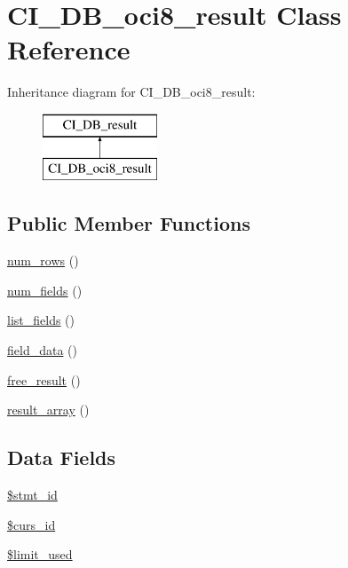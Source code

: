 \hypertarget{class_c_i___d_b__oci8__result}{\section{C\-I\-\_\-\-D\-B\-\_\-oci8\-\_\-result Class Reference}
\label{class_c_i___d_b__oci8__result}
}
Inheritance diagram for C\-I\-\_\-\-D\-B\-\_\-oci8\-\_\-result\-:\begin{figure}[H]
\begin{center}
\leavevmode
\includegraphics[height=2.000000cm]{class_c_i___d_b__oci8__result}
\end{center}
\end{figure}
\subsection*{Public Member Functions}
\begin{DoxyCompactItemize}
\item 
\hyperlink{class_c_i___d_b__oci8__result_a218657c303ee499b97710ab0cd2f5d6e}{num\-\_\-rows} ()
\item 
\hyperlink{class_c_i___d_b__oci8__result_af831bf363e4d7d661a717a4932af449d}{num\-\_\-fields} ()
\item 
\hyperlink{class_c_i___d_b__oci8__result_a50b54eb4ea7cfd039740f532988ea776}{list\-\_\-fields} ()
\item 
\hyperlink{class_c_i___d_b__oci8__result_a84bffd65e53902ade1591716749a33e3}{field\-\_\-data} ()
\item 
\hyperlink{class_c_i___d_b__oci8__result_aad2d98d6beb3d6095405356c6107b473}{free\-\_\-result} ()
\item 
\hyperlink{class_c_i___d_b__oci8__result_a444f7dd61bfbe3931a7188adad61feae}{result\-\_\-array} ()
\end{DoxyCompactItemize}
\subsection*{Data Fields}
\begin{DoxyCompactItemize}
\item 
\hyperlink{class_c_i___d_b__oci8__result_a1a97f17fd259cd27c73b65e6c3706ec0}{\$stmt\-\_\-id}
\item 
\hyperlink{class_c_i___d_b__oci8__result_a75e7d18ad2e68ace3813533c9da2e179}{\$curs\-\_\-id}
\item 
\hyperlink{class_c_i___d_b__oci8__result_a96df35d7e3e76bef21ebb80234fe59e8}{\$limit\-\_\-used}
\end{DoxyCompactItemize}
